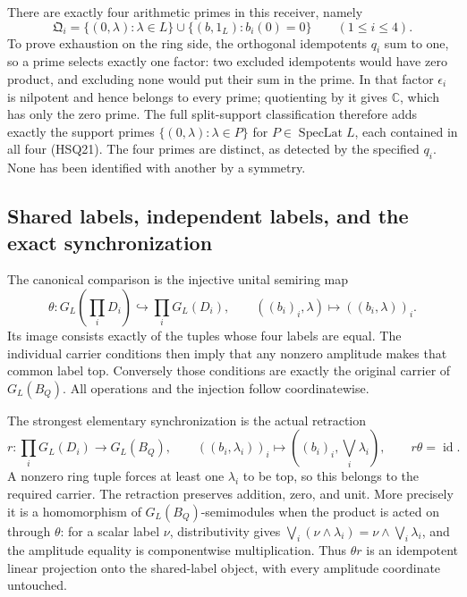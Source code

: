 There are exactly four arithmetic primes in this receiver, namely
\begin{equation}\tag{HSQ21}
 \mathfrak Q_i=\{(0,\lambda):\lambda\in L\}
       \cup\{(b,1_L):b_i(0)=0\}\qquad(1\le i\le4).
\end{equation}
To prove exhaustion on the ring side, the orthogonal idempotents
$q_i$ sum to one, so a prime selects exactly one factor: two
excluded idempotents would have zero product, and excluding none
would put their sum in the prime. In that factor $\epsilon_i$
is nilpotent and hence belongs to every prime; quotienting by it
gives $\mathbb C$, which has only the zero prime. The full
split-support classification therefore adds exactly the support
primes $\{(0,\lambda):\lambda\in P\}$ for
$P\in\operatorname{SpecLat}L$, each contained in all four
(HSQ21). The four primes are distinct, as detected by the
specified $q_i$. None has been identified with another by a symmetry.

\subsection{Shared labels, independent labels, and the exact synchronization}

The canonical comparison is the injective unital semiring map
\begin{equation}\tag{HSQ22}
 \theta:G_L\!\left(\prod_iD_i\right)\hookrightarrow
           \prod_iG_L(D_i),\qquad
 ((b_i)_i,\lambda)\longmapsto((b_i,\lambda))_i.
\end{equation}
Its image consists exactly of the tuples whose four labels are
equal. The individual carrier conditions then imply that any
nonzero amplitude makes that common label top. Conversely those
conditions are exactly the original carrier of $G_L(B_Q)$.
All operations and the injection follow coordinatewise.

The strongest elementary synchronization is the actual retraction
\begin{equation}\tag{HSQ23}
 r:\prod_iG_L(D_i)\longrightarrow G_L(B_Q),\qquad
 ((b_i,\lambda_i))_i\longmapsto
       ((b_i)_i,\bigvee_i\lambda_i),\qquad r\theta=\operatorname{id}.
\end{equation}
A nonzero ring tuple forces at least one $\lambda_i$ to be top,
so this belongs to the required carrier. The retraction preserves
addition, zero, and unit. More precisely it is a homomorphism of
$G_L(B_Q)$-semimodules when the product is acted on through
$\theta$: for a scalar label $\nu$, distributivity gives
$\bigvee_i(\nu\wedge\lambda_i)=\nu\wedge\bigvee_i\lambda_i$,
and the amplitude equality is componentwise multiplication.
Thus $\theta r$ is an idempotent linear projection onto the
shared-label object, with every amplitude coordinate untouched.

